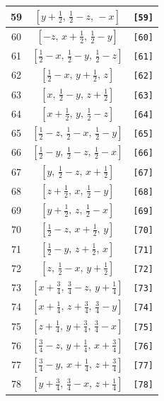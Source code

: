 \documentclass[fleqn,8pt]{jsarticle}
\begin{document}
\begin{longtable}{ccc}
59 & $\left[ y + \frac{1}{2},\, \frac{1}{2} - z,\, - x \right]$ & {\tt [59]} \\ \hline
60 & $\left[ - z,\, x + \frac{1}{2},\, \frac{1}{2} - y \right]$ & {\tt [60]} \\ \hline
61 & $\left[ \frac{1}{2} - x,\, \frac{1}{2} - y,\, \frac{1}{2} - z \right]$ & {\tt [61]} \\ \hline
62 & $\left[ \frac{1}{2} - x,\, y + \frac{1}{2},\, z \right]$ & {\tt [62]} \\ \hline
63 & $\left[ x,\, \frac{1}{2} - y,\, z + \frac{1}{2} \right]$ & {\tt [63]} \\ \hline
64 & $\left[ x + \frac{1}{2},\, y,\, \frac{1}{2} - z \right]$ & {\tt [64]} \\ \hline
65 & $\left[ \frac{1}{2} - z,\, \frac{1}{2} - x,\, \frac{1}{2} - y \right]$ & {\tt [65]} \\ \hline
66 & $\left[ \frac{1}{2} - y,\, \frac{1}{2} - z,\, \frac{1}{2} - x \right]$ & {\tt [66]} \\ \hline
67 & $\left[ y,\, \frac{1}{2} - z,\, x + \frac{1}{2} \right]$ & {\tt [67]} \\ \hline
68 & $\left[ z + \frac{1}{2},\, x,\, \frac{1}{2} - y \right]$ & {\tt [68]} \\ \hline
69 & $\left[ y + \frac{1}{2},\, z,\, \frac{1}{2} - x \right]$ & {\tt [69]} \\ \hline
70 & $\left[ \frac{1}{2} - z,\, x + \frac{1}{2},\, y \right]$ & {\tt [70]} \\ \hline
71 & $\left[ \frac{1}{2} - y,\, z + \frac{1}{2},\, x \right]$ & {\tt [71]} \\ \hline
72 & $\left[ z,\, \frac{1}{2} - x,\, y + \frac{1}{2} \right]$ & {\tt [72]} \\ \hline
73 & $\left[ x + \frac{3}{4},\, \frac{3}{4} - z,\, y + \frac{1}{4} \right]$ & {\tt [73]} \\ \hline
74 & $\left[ x + \frac{1}{4},\, z + \frac{3}{4},\, \frac{3}{4} - y \right]$ & {\tt [74]} \\ \hline
75 & $\left[ z + \frac{1}{4},\, y + \frac{3}{4},\, \frac{3}{4} - x \right]$ & {\tt [75]} \\ \hline
76 & $\left[ \frac{3}{4} - z,\, y + \frac{1}{4},\, x + \frac{3}{4} \right]$ & {\tt [76]} \\ \hline
77 & $\left[ \frac{3}{4} - y,\, x + \frac{1}{4},\, z + \frac{3}{4} \right]$ & {\tt [77]} \\ \hline
78 & $\left[ y + \frac{3}{4},\, \frac{3}{4} - x,\, z + \frac{1}{4} \right]$ & {\tt [78]} \\ \hline

\end{longtable}
\end{document}
